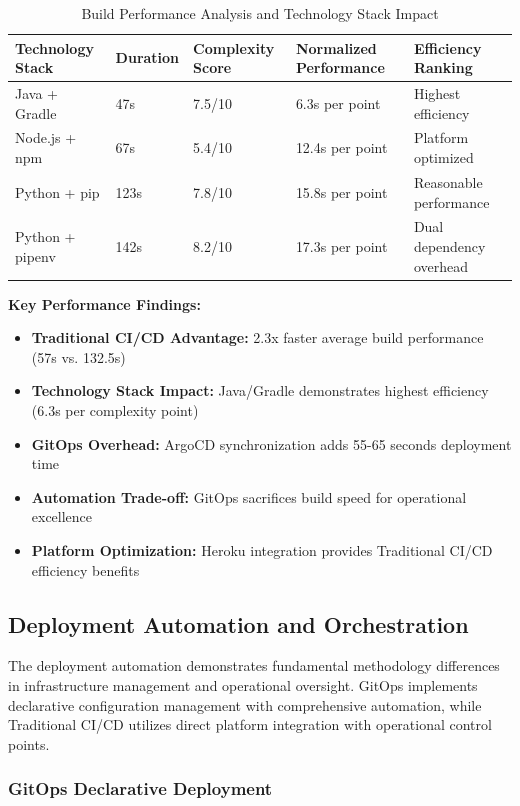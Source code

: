 \begin{table}[H]
\centering
\caption{Build Performance Analysis and Technology Stack Impact}
\label{tab:build-performance-analysis}
\begin{tabular}{|p{3cm}|p{2cm}|p{2.5cm}|p{2.5cm}|p{3cm}|}
\hline
\textbf{Technology Stack} & \textbf{Duration} & \textbf{Complexity Score} & \textbf{Normalized Performance} & \textbf{Efficiency Ranking} \\
\hline
Java + Gradle & 47s & 7.5/10 & 6.3s per point & Highest efficiency \\
\hline
Node.js + npm & 67s & 5.4/10 & 12.4s per point & Platform optimized \\
\hline
Python + pip & 123s & 7.8/10 & 15.8s per point & Reasonable performance \\
\hline
Python + pipenv & 142s & 8.2/10 & 17.3s per point & Dual dependency overhead \\
\hline
\end{tabular}
\end{table}

\textbf{Key Performance Findings:}
\begin{itemize}
\item \textbf{Traditional CI/CD Advantage:} 2.3x faster average build performance (57s vs. 132.5s)
\item \textbf{Technology Stack Impact:} Java/Gradle demonstrates highest efficiency (6.3s per complexity point)
\item \textbf{GitOps Overhead:} ArgoCD synchronization adds 55-65 seconds deployment time
\item \textbf{Automation Trade-off:} GitOps sacrifices build speed for operational excellence
\item \textbf{Platform Optimization:} Heroku integration provides Traditional CI/CD efficiency benefits
\end{itemize}

\subsection{Deployment Automation and Orchestration}

The deployment automation demonstrates fundamental methodology differences in infrastructure management and operational oversight. GitOps implements declarative configuration management with comprehensive automation, while Traditional CI/CD utilizes direct platform integration with operational control points.

\subsubsection{GitOps Declarative Deployment}

